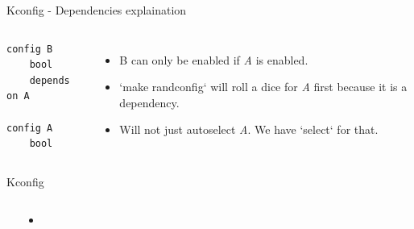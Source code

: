 \documentclass[mathserif,serif]{beamer}
\newenvironment{items}{
\begin{itemize}
  \setlength{\itemsep}{0pt}
  \setlength{\parskip}{7pt}
  \setlength{\parsep}{4pt}
}{\end{itemize}}
\begin{document}
\begin{frame}[t,fragile]{Kconfig - Dependencies explaination}

    \begin{columns}[T]
    \begin{lstlisting}
config B
    bool
    depends on A

config A
    bool
    \end{lstlisting}
    \begin{items}
        \item B can only be enabled if \emph{A} is enabled.
        \item `make randconfig` will roll a dice for \emph{A} first because it 
                is a dependency.
        \item Will not just autoselect \emph{A}. We have `select` for that.
    \end{items}

    \end{columns}
    
\end{frame}

\begin{frame}[t]{Kconfig}

    \begin{columns}[T]

    \begin{lstlisting}

    \end{lstlisting}


    \begin{items}
        \item
    \end{items}

    \end{columns}
\end{frame}
\end{document}

